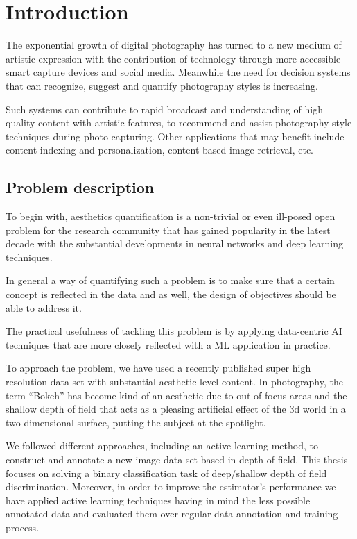 \chapter{Introduction} \label{c1:intro}

The exponential growth of digital photography has turned to a new medium of artistic expression with the contribution of technology through more accessible smart capture devices and social media. Meanwhile the need for decision systems that can recognize, suggest and quantify photography styles is increasing.

Such systems can contribute to rapid broadcast and understanding of high quality content with artistic features, to recommend and assist photography style techniques during photo capturing. Other applications that may benefit include content indexing and personalization, content-based image retrieval, etc.

\section{Problem description}

To begin with, aesthetics quantification is a non-trivial or even ill-posed open problem for the research community that has gained popularity in the latest decade with the substantial developments in neural networks and deep learning techniques.

In general a way of quantifying such a problem is to make sure that a certain concept is reflected in the data and as well, the design of objectives should be able to address it.

The practical usefulness of tackling this problem is by applying data-centric AI techniques that are more closely reflected with a ML application in practice.

To approach the problem, we have used a recently published super high resolution data set with substantial aesthetic level content. 
In photography, the term ``Bokeh'' has become kind of an aesthetic due to out of focus areas and the shallow depth of field that acts as a pleasing artificial effect of the 3d world in a two-dimensional surface, putting the subject at the spotlight.

We followed different approaches, including an active learning method, to construct and annotate a new image data set based in depth of field.
This thesis focuses on solving a binary classification task of deep/shallow depth of field discrimination. Moreover, in order to improve the estimator’s performance we have applied active learning techniques having in mind the less possible annotated data and evaluated them over regular data annotation and training process.

